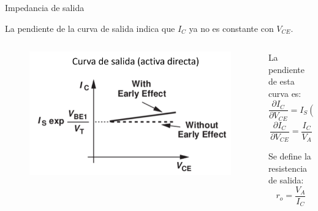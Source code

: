\documentclass[t,aspectratio=169]{beamer}
\begin{document}
\begin{frame}{Impedancia de salida}

La pendiente de la curva de salida indica que $I_C$ ya no es constante con $V_{CE}$.

\begin{columns}
\begin{column}{0.5\textwidth}

\begin{figure}[H]
    \centering
    \includegraphics[width=\textwidth]{figuras/curva_salida_con_early.png}
\end{figure}

\end{column}
\begin{column}{0.5\textwidth}

La pendiente de esta curva es:
%
\[ \dfrac{\partial I_C}{\partial V_{CE} } = I_S \left( e^{V_{BE}/V_t} \right) \left( \dfrac{1}{V_A} \right)  \]
%
\[ \dfrac{\partial I_C}{\partial V_{CE} } = \dfrac{I_C}{V_A} \]

\vspace{5mm}
Se define la resistencia de salida:
%
\[ r_o = \dfrac{V_A}{I_C} \]

\end{column}
\end{columns}
    
\end{frame}
\end{document}

